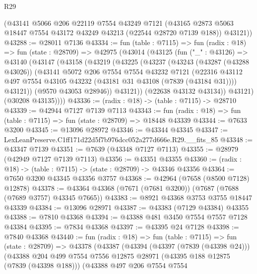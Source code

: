 \begin{lexlean}{R29}
\begin{coremodule}
      (@43141
        @5066
        @206
        @22119
        @7554
        @43249
        @7121
        (@43165 @2873 @5063 @18447 @7554 @43172 @43249 @43213 (@22544 @28720 @7139 @188))
        @43121))
@43288 := @28011 @7136
@43334 := fun (table : @7115) =>
  fun (radix : @18) =>
  fun (state : @28709) =>
  @42975
    (@43014
      (@43125
        (fun ("_" : @43126) =>
        @43140
          (@43147
            (@43158
              (@43219
                (@43225
                  (@43237
                    (@43243
                      (@43287 (@43288 @43026))
                      (@43141
                        @5072
                        @206
                        @7554
                        @7554
                        @43232
                        @7121
                        (@22316
                          @43112
                          @497
                          @7554
                          @43105
                          @43232
                          (@43181 @31 @43108 (@7839 (@43184 @31))))
                        @43121))
                    (@9570 @43053 @28946))
                  @43121))
              (@22638 @43132 @43134))
            @43121)
          (@30208 @43135))))
@43336 := (radix : @18) -> (table : @7115) -> @28710
@43339 := @42944 @7127 @7139 @7113
@43343 := fun (radix : @18) => fun (table : @7115) => fun (state : @28709) => @18448 @43339
@43344 := @7633 @3200
@43345 := @13096 @28972
@43346 := @43344 @43345
@43347 := LexLeanPreserve.C1ff171d22d5f7b976dcc052a277d666e.R29.__fits_85
@43348 := @43347 @7139
@43351 := @7639 (@43348 @7127 @7113)
@43355 := @28979 (@42949 @7127 @7139 @7113)
@43356 := @43351 @43355
@43360 := (radix : @18) -> (table : @7115) -> (state : @28709) -> @43346 @43356
@43364 := @7650 @3200 @43345 @43356 @3757
@43368 := @42964 (@7658 (@8500 @7128) @12878)
@43378 := @43364 @43368 (@7671 (@7681 @3200)) (@7687 (@7688 (@7689 @3757) @43345 @7665))
@43383 := @8921 @43368 @3753 @3755 @18447 @43339
@43384 := @13096 @28971
@43387 := @43383 (@7129 @43384) @43355
@43388 := @7810 @43368
@43394 := @43388 @481 @3450 @7554 @7557 @7128 @43384
@43395 := @7834 @43368
@43397 := @43395 @24 @7128
@43398 := @7840 @43368
@43440 := fun (radix : @18) =>
  fun (table : @7115) =>
  fun (state : @28709) =>
  @43378
    (@43387
      (@43394
        (@43397 (@7839 (@43398 @24)))
        (@43388
          @204
          @499
          @7554
          @7556
          @12875
          @28971
          (@43395 @188 @12875 (@7839 (@43398 @188)))
          (@43388
            @497
            @206
            @7554
            @7554

\end{coremodule}
\end{lexlean}
